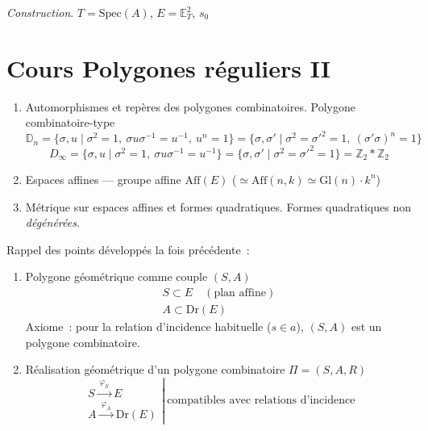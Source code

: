 \documentclass[11pt,a4paper]{article}
\begin{document}
\emph{Construction}. $T = \mathrm{Spec}(A)$, \struck{\ill{}}
$E = \mathbb{E}^{2}_{T}$, $s_0$

\section{Cours Polygones réguliers II}


\begin{enumerate}
  \item[1] Automorphismes et repères des polygones combinatoires. Polygone combinatoire-type
  \[
    \mathbb{D}_n = \{\sigma,u \mid \sigma^{2} = 1,\ \sigma u \sigma^{-1} = u^{-1},\ u^{n} = 1\}
    = \{\sigma,\sigma' \mid \sigma^{2} = \sigma'^{2} = 1,\ (\sigma'\sigma)^{n} = 1\}
  \]
  \[
    D_{\infty} = \{\sigma,u \mid \sigma^{2} = 1,\ \sigma u \sigma^{-1} = u^{-1}\}
    = \{\sigma,\sigma' \mid \sigma^{2} = \sigma'^{2} = 1\} = \mathbb{Z}_2 * \mathbb{Z}_2
  \]
  \item[2.] Espaces affines --- groupe affine $\mathrm{Aff}(E)$ ($\simeq \mathrm{Aff}(n,k) \simeq \mathrm{Gl}(n)\cdot k^{n}$)
  \item[3.] Métrique sur espaces affines et formes quadratiques. Formes quadratiques non \emph{dégénérées}.
\end{enumerate}

Rappel des points développés la fois précédente~:
\begin{enumerate}
  \item[a)] Polygone géométrique comme couple $(S,A)$
  \[
    \begin{array}{l} S \subset E \quad (\text{plan affine}) \\ A \subset \mathrm{Dr}(E) \end{array}
  \]
  Axiome~: pour la relation d'incidence habituelle ($s \in a$), $(S,A)$ est un polygone combinatoire.
  \item[b)] Réalisation géométrique d'un polygone combinatoire $\Pi = (S,A,R)$
  \[
    \left.\begin{array}{l} S \xrightarrow{\ \varphi_S\ } E \\ A \xrightarrow{\ \varphi_A\ } \mathrm{Dr}(E) \end{array}\right|
    \ \text{compatibles avec relations d'incidence}
  \]
\end{enumerate}
\end{document}
